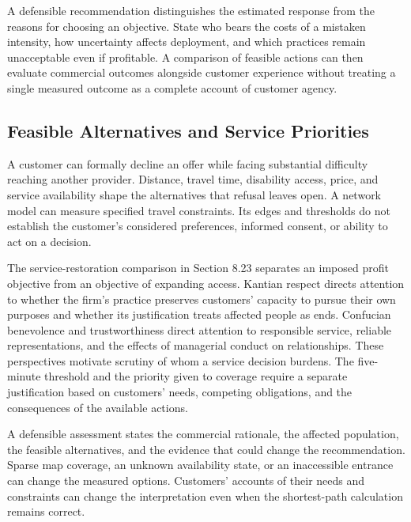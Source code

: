 A defensible recommendation distinguishes the estimated response from
the reasons for choosing an objective. State who bears the costs of a
mistaken intensity, how uncertainty affects deployment, and which
practices remain unacceptable even if profitable. A comparison of
feasible actions can then evaluate commercial outcomes alongside
customer experience without treating a single measured outcome as a
complete account of customer agency.


\hypertarget{M09-feasible-alternatives-and-service-priorities}{%
\subsection{Feasible Alternatives and Service
Priorities}\label{M09-feasible-alternatives-and-service-priorities}}

\noindent \noindent A customer can formally decline an offer while facing
substantial difficulty reaching another provider. Distance, travel time,
disability access, price, and service availability shape the
alternatives that refusal leaves open. A network model can measure
specified travel constraints. Its edges and thresholds do not establish
the customer's considered preferences, informed consent, or ability to
act on a decision.

The service-restoration comparison in Section 8.23 separates an imposed
profit objective from an objective of expanding access. Kantian respect
directs attention to whether the firm's practice preserves customers'
capacity to pursue their own purposes and whether its justification
treats affected people as ends. Confucian benevolence and
trustworthiness direct attention to responsible service, reliable
representations, and the effects of managerial conduct on relationships.
These perspectives motivate scrutiny of whom a service decision burdens.
The five-minute threshold and the priority given to coverage require a
separate justification based on customers' needs, competing obligations,
and the consequences of the available actions.

A defensible assessment states the commercial rationale, the affected
population, the feasible alternatives, and the evidence that could
change the recommendation. Sparse map coverage, an unknown availability
state, or an inaccessible entrance can change the measured options.
Customers' accounts of their needs and constraints can change the
interpretation even when the shortest-path calculation remains correct.

